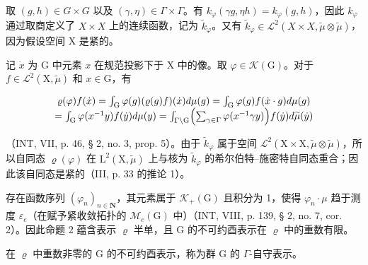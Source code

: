 取 \((g,h) \in G \times G\) 以及 \((\gamma, \eta) \in \Gamma \times \Gamma\)。有 \(k_{\varphi}(\gamma g, \eta h) = k_{\varphi}(g, h)\)，因此 \(k_{\varphi}\) 通过取商定义了 \(X \times X\) 上的连续函数，记为 \(\widetilde{k}_{\varphi}\)。又有 \(\widetilde{k}_{\varphi} \in \mathcal{L}^{2}(X \times X, \widetilde{\mu} \otimes \widetilde{\mu})\)，因为假设空间 X 是紧的。

记 \(\dot{x}\) 为 G 中元素 \(x\) 在规范投影下于 X 中的像。取 \(\varphi \in \mathcal{K}(\mathrm{G})\)。对于 \(f \in \mathcal{L}^2(\mathrm{X},\widetilde{\mu})\) 和 \(x \in \mathrm{G}\)，有

\[
\begin{array}{c} \varrho (\varphi) f (\dot {x}) = \int_ {\mathrm{G}} \varphi (g)   (\varrho (g) f) (\dot {x}) d \mu (g) = \int_ {\mathrm{G}} \varphi (g) f (\dot {x} \cdot g) d \mu (g) \\ = \int_ {\mathrm{G}} \varphi (x ^ {- 1} y) f (\dot {y}) d \mu (y) = \int_ {\Gamma \backslash \mathrm{G}} \Bigl (\sum_ {\gamma \in \Gamma} \varphi (x ^ {- 1} \gamma y) \Bigr) f (\dot {y}) d \widetilde {\mu} (\dot {y}) \end{array}
\]

（INT, VII, p. 46, § 2, no. 3, prop. 5）。由于 \(\widetilde{k}_{\varphi}\) 属于空间 \(\mathcal{L}^2 (\mathrm{X}\times \mathrm{X},\widetilde{\mu}\otimes \widetilde{\mu})\)，所以自同态 \(\varrho (\varphi)\) 在 \(\mathrm{L}^2 (\mathrm{X},\widetilde{\mu})\) 上与核为 \(\widetilde{k}_{\varphi}\) 的希尔伯特–施密特自同态重合；因此该自同态是紧的（III, p. 33 的推论 1）。

存在函数序列 \((\varphi_{n})_{n\in\mathbf{N}}\)，其元素属于 \(\mathcal{K}_{+}(\mathrm{G})\) 且积分为 1，使得 \(\varphi_{n}\cdot\mu\) 趋于测度 \(\varepsilon_{e}\)（在赋予紧收敛拓扑的 \(\mathcal{M}_{c}(\mathrm{G})\) 中）（INT, VIII, p. 139, § 2, no. 7, cor. 2）。因此命题 2 蕴含表示 \(\varrho\) 半单，且 G 的不可约酉表示在 \(\varrho\) 中的重数有限。

在 \(\varrho\) 中重数非零的 G 的不可约酉表示，称为群 G 的 \(\Gamma\)-自守表示。

